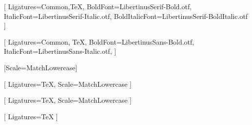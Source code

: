 %

\setmainfont{LibertinusSerif-Regular.otf}[
    Ligatures={Common,TeX},
    BoldFont=LibertinusSerif-Bold.otf,
    ItalicFont=LibertinusSerif-Italic.otf,
    BoldItalicFont=LibertinusSerif-BoldItalic.otf
]

\setsansfont{LibertinusSans-Regular.otf}[
    Ligatures={Common, TeX},
    BoldFont=LibertinusSans-Bold.otf,
    ItalicFont=LibertinusSans-Italic.otf,
]

\setmonofont{Consolas}[Scale=MatchLowercase]

[
    Ligatures=TeX,
    Scale=MatchLowercase
]

\setmathfontface{}[
    Ligatures=TeX,
    Scale=MatchLowercase
]
\setoperatorfont\mathoper

\newfontface{}[
    Ligatures=TeX
]
